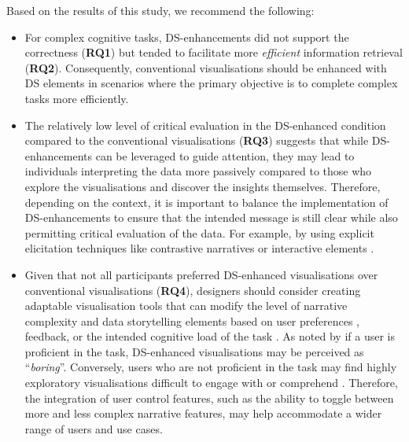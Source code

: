 Based on the results of this study, we recommend the following:
\begin{itemize}
    \item For complex cognitive tasks, DS-enhancements did not support the correctness (\textbf{RQ1}) but tended to facilitate more \textit{efficient} information retrieval (\textbf{RQ2}). Consequently, conventional visualisations should be enhanced with DS elements in scenarios where the primary objective is to complete complex tasks more efficiently. 
    \item The relatively low level of critical evaluation in the DS-enhanced condition compared to the conventional visualisations (\textbf{RQ3}) suggests that while DS-enhancements can be leveraged to guide attention, they may lead to individuals interpreting the data more passively compared to those who explore the visualisations and discover the insights themselves. Therefore, depending on the context, it is important to balance the implementation of DS-enhancements to ensure that the intended message is still clear while also permitting critical evaluation of the data. For example, by using explicit elicitation techniques like contrastive narratives \cite{rogha2024impact} or interactive elements \cite{morth2023scrollyvis,shi2023breaking}. 
    \item Given that not all participants preferred DS-enhanced visualisations over conventional visualisations (\textbf{RQ4}), designers should consider creating adaptable visualisation tools that can modify the level of narrative complexity and data storytelling elements based on user preferences \cite{liu2020survey}, feedback, or the intended cognitive load of the task \cite{carenini2014highlighting}. As noted by \citet{figueiras2014narrative} if a user is proficient in the task, DS-enhanced visualisations may be perceived as ``\textit{boring}''. Conversely, users who are not proficient in the task may find highly exploratory visualisations difficult to engage with or comprehend \cite{figueiras2014narrative}. Therefore, the integration of user control features, such as the ability to toggle between more and less complex narrative features, may help accommodate a wider range of users and use cases.
\end{itemize}

